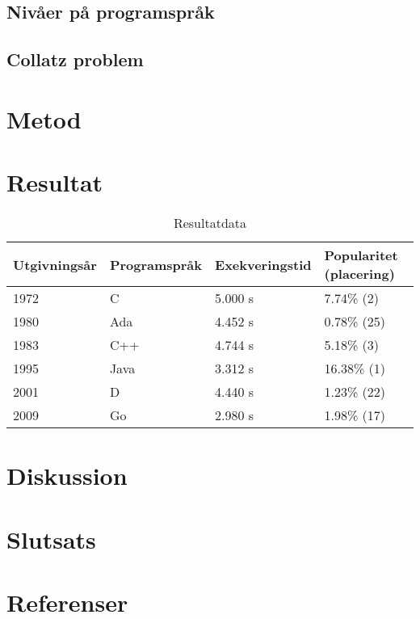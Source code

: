 \documentclass[12pt,swedish]{article}
\begin{document}
\subsection{Nivåer på programspråk}
\subsection{Collatz problem}

\section{Metod}

\section{Resultat}

\begin{table}[]
\centering
\caption{Resultatdata}
\label{table-result}
\begin{tabular}{@{}llll@{}}
\toprule
Utgivningsår & Programspråk & Exekveringstid & Popularitet (placering) \\ \midrule
1972         & C            & 5.000 s        & 7.74\% (2)              \\
1980         & Ada          & 4.452 s        & 0.78\% (25)             \\
1983         & C++          & 4.744 s        & 5.18\% (3)              \\
1995         & Java         & 3.312 s        & 16.38\% (1)             \\
2001         & D            & 4.440 s        & 1.23\% (22)             \\
2009         & Go           & 2.980 s        & 1.98\% (17)             \\ \bottomrule
\end{tabular}
\end{table}

\section{Diskussion}

\section{Slutsats}

\section{Referenser}
\printbibliography
\end{document}

